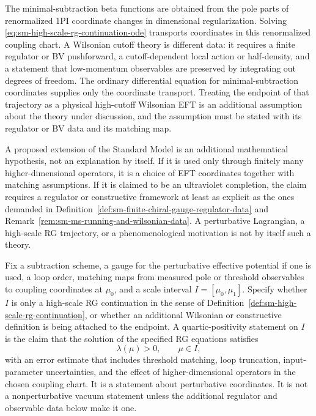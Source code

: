 \begin{remark}
\label{rem:sm-ms-running-and-wilsonian-data}
The minimal-subtraction beta functions are obtained from the pole parts of
renormalized 1PI coordinate changes in dimensional regularization.  Solving
\eqref{eq:sm-high-scale-rg-continuation-ode} transports coordinates in this
renormalized coupling chart.  A Wilsonian cutoff theory is different data: it
requires a finite regulator or BV pushforward, a cutoff-dependent local
action or half-density, and a statement that low-momentum observables are
preserved by integrating out degrees of freedom.  The ordinary differential
equation for minimal-subtraction coordinates supplies only the coordinate
transport.  Treating the endpoint of that trajectory as a physical
high-cutoff Wilsonian EFT is an additional assumption about the theory under
discussion, and the assumption must be stated with its regulator or BV data
and its matching map.
\end{remark}

\begin{remark}
A proposed extension of the Standard Model is an additional mathematical
hypothesis, not an explanation by itself.  If it is used only through finitely
many higher-dimensional operators, it is a choice of EFT coordinates together
with matching assumptions.  If it is claimed to be an ultraviolet completion,
the claim requires a regulator or constructive framework at least as explicit
as the ones demanded in
Definition~\ref{def:sm-finite-chiral-gauge-regulator-data} and
Remark~\ref{rem:sm-ms-running-and-wilsonian-data}.  A perturbative
Lagrangian, a high-scale RG trajectory, or a phenomenological motivation is
not by itself such a theory.
\end{remark}

\begin{definition}
\label{def:sm-quartic-positivity-statement}
Fix a subtraction scheme, a gauge for the perturbative effective potential if
one is used, a loop order, matching maps from measured pole or threshold
observables to coupling coordinates at \(\mu_0\), and a scale interval
\(I=[\mu_0,\mu_1]\).  Specify whether \(I\) is only a high-scale RG
continuation in the sense of
Definition~\ref{def:sm-high-scale-rg-continuation}, or whether an
additional Wilsonian or constructive definition is being attached to the
endpoint.
A quartic-positivity statement on \(I\) is the claim that the solution of the
specified RG equations satisfies
\begin{equation}
  \lambda(\mu)>0,\qquad \mu\in I,
  \label{eq:sm-quartic-positive-trajectory}
\end{equation}
with an error estimate that includes threshold matching, loop truncation,
input-parameter uncertainties, and the effect of higher-dimensional
operators in the chosen coupling chart.  It is a statement about
perturbative coordinates.  It is not a nonperturbative vacuum statement
unless the additional regulator and observable data below make it one.
\end{definition}

